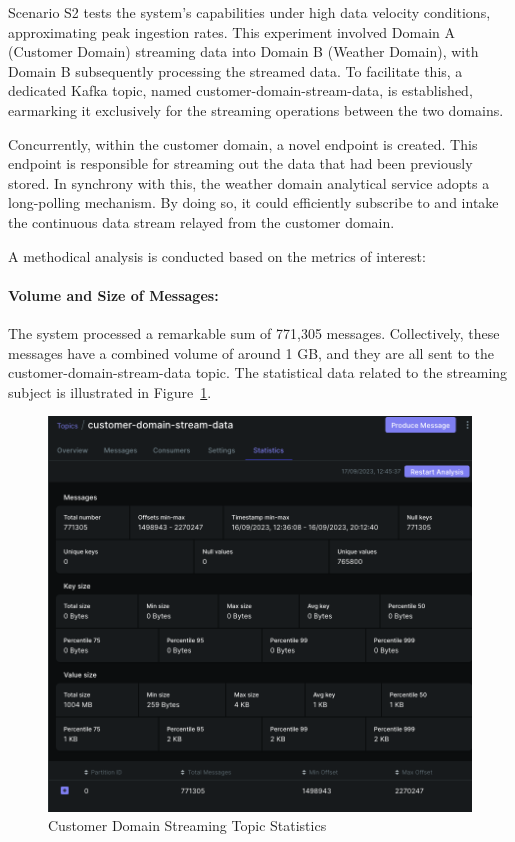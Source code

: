 \documentclass[journal]{IEEEtran}
\begin{document}
Scenario S2 tests the system's capabilities under high data velocity conditions, approximating peak ingestion rates. This experiment involved Domain A (Customer Domain) streaming data into Domain B (Weather Domain), with Domain B subsequently processing the streamed data. To facilitate this, a dedicated Kafka topic, named customer-domain-stream-data, is established, earmarking it exclusively for the streaming operations between the two domains. 

Concurrently, within the customer domain, a novel endpoint is created. This endpoint is responsible for streaming out the data that had been previously stored. In synchrony with this, the weather domain analytical service adopts a long-polling mechanism. By doing so, it could efficiently subscribe to and intake the continuous data stream relayed from the customer domain.

A methodical analysis is conducted based on the metrics of interest:

\paragraph{Volume and Size of Messages:} The system processed a remarkable sum of 771,305 messages. Collectively, these messages have a combined volume of around 1 GB, and they are all sent to the customer-domain-stream-data topic. The statistical data related to the streaming subject is illustrated in Figure~\ref{customerDomainStreamingTopicStatistics}.


\begin{figure}
  \centering
  \includegraphics[width=\columnwidth]{images/customer-domain-stream-data-topic-statistics.png}
  \caption{Customer Domain Streaming Topic Statistics}
  \label{customerDomainStreamingTopicStatistics}
\end{figure}
\end{document}
